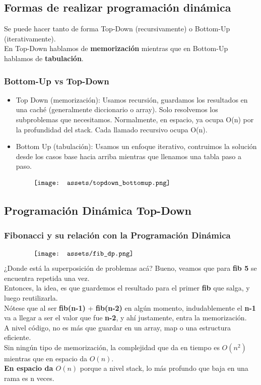 \documentclass[10pt,a4paper]{article}
\begin{document}
\subsection*{Formas de realizar programación dinámica}
Se puede hacer tanto de forma Top-Down (recursivamente) o Bottom-Up (iterativamente). \\
En Top-Down hablamos de \textbf{memorización} mientras que en Bottom-Up hablamos de \textbf{tabulación}. 
\subsubsection*{Bottom-Up vs Top-Down}
\begin{itemize}
    \item Top Down (memorización): Usamos recursión, guardamos los resultados en una caché (generalmente diccionario o array). Solo resolvemos los subproblemas que necesitamos. Normalmente, en espacio, ya ocupa O(n) por la profundidad del stack. Cada llamado recursivo ocupa O(n). 
    \item Bottom Up (tabulación): Usamos un enfoque iterativo, contruimos la solución desde los casos base hacia arriba mientras que llenamos una tabla paso a paso. 
\end{itemize}
\[\begin{minipage}[b]{0.8\textwidth}
    \texttt{[image: assets/topdown\_bottomup.png]}
\end{minipage}\]
\subsection*{Programación Dinámica Top-Down}
\subsubsection*{Fibonacci y su relación con la Programación Dinámica}
\[\begin{minipage}[b]{0.8\textwidth}
    \texttt{[image: assets/fib\_dp.png]}
\end{minipage}\]
¿Donde está la superposición de problemas acá? Bueno, veamos que para \textbf{fib 5} se encuentra repetida una vez. \\
Entonces, la idea, es que guardemos el resultado para el primer \textbf{fib} que salga, y luego reutilizarla. \\
Nótese que al ser \textbf{fib(n-1)} + \textbf{fib(n-2)} en algún momento, indudablemente el \textbf{n-1} va a llegar a ser el valor que fue \textbf{n-2}, y ahí justamente, entra la memorización. \\
A nivel código, no es más que guardar en un array, map o una estructura eficiente. \\ 
Sin ningún tipo de memorización, la complejidad que da en tiempo es $O(n^{2})$ mientras que en espacio da $O(n)$. \\
\textbf{En espacio da $O(n)$} porque a nivel stack, lo más profundo que baja en una rama es n veces. 
\end{document}
